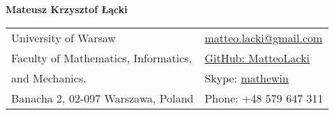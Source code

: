 \documentclass[letterpaper,11pt,oneside]{article}
\newcommand*{\Skype}{\href{skype name:mathewin?add}{mathewin}}
\newcommand{\Absender}[1][\normalsize]{\Skype}
\begin{document}

\noindent  \LARGE{\textbf{Mateusz Krzysztof Łącki}}  \\
\vspace{-2ex}
\normalsize


\begin{center}
\begin{tabular}{l l}
 University of Warsaw& \hspace{1in}\href{mailto:matteo.lacki@gmail.com}{matteo.lacki@gmail.com}\\
 Faculty of Mathematics, Informatics,     & \hspace{1in}\href{https://github.com/MatteoLacki}{GitHub: MatteoLacki}   \\
 and Mechanics. & \hspace{1in}Skype: \Absender  \\
 Banacha 2, 02-097 Warszawa, Poland & \hspace{1in}Phone: +48 579  647 311\\
\end{tabular}
\end{center}


\end{document}
